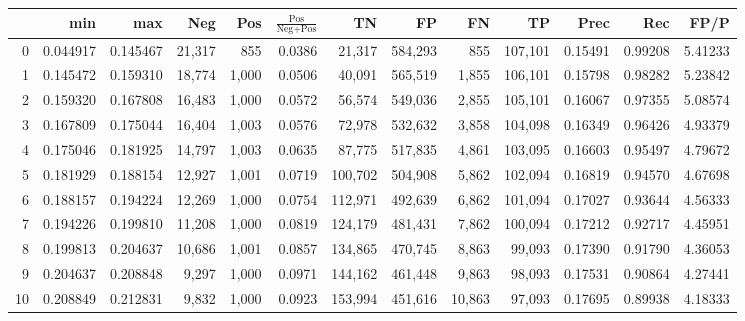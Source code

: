 \begin{tabular}{rrrrrrrrrrrrr}
\toprule
{} &       min &       max &     Neg &    Pos & $\frac{\text{Pos}}{\text{Neg}+\text{Pos}}$ &       TN &       FP &       FN &       TP &     Prec &      Rec &     FP/P \\
\midrule
0   &  0.044917 &  0.145467 &  21,317 &    855 &                                     0.0386 &   21,317 &  584,293 &      855 &  107,101 &  0.15491 &  0.99208 &  5.41233 \\
1   &  0.145472 &  0.159310 &  18,774 &  1,000 &                                     0.0506 &   40,091 &  565,519 &    1,855 &  106,101 &  0.15798 &  0.98282 &  5.23842 \\
2   &  0.159320 &  0.167808 &  16,483 &  1,000 &                                     0.0572 &   56,574 &  549,036 &    2,855 &  105,101 &  0.16067 &  0.97355 &  5.08574 \\
3   &  0.167809 &  0.175044 &  16,404 &  1,003 &                                     0.0576 &   72,978 &  532,632 &    3,858 &  104,098 &  0.16349 &  0.96426 &  4.93379 \\
4   &  0.175046 &  0.181925 &  14,797 &  1,003 &                                     0.0635 &   87,775 &  517,835 &    4,861 &  103,095 &  0.16603 &  0.95497 &  4.79672 \\
5   &  0.181929 &  0.188154 &  12,927 &  1,001 &                                     0.0719 &  100,702 &  504,908 &    5,862 &  102,094 &  0.16819 &  0.94570 &  4.67698 \\
6   &  0.188157 &  0.194224 &  12,269 &  1,000 &                                     0.0754 &  112,971 &  492,639 &    6,862 &  101,094 &  0.17027 &  0.93644 &  4.56333 \\
7   &  0.194226 &  0.199810 &  11,208 &  1,000 &                                     0.0819 &  124,179 &  481,431 &    7,862 &  100,094 &  0.17212 &  0.92717 &  4.45951 \\
8   &  0.199813 &  0.204637 &  10,686 &  1,001 &                                     0.0857 &  134,865 &  470,745 &    8,863 &   99,093 &  0.17390 &  0.91790 &  4.36053 \\
9   &  0.204637 &  0.208848 &   9,297 &  1,000 &                                     0.0971 &  144,162 &  461,448 &    9,863 &   98,093 &  0.17531 &  0.90864 &  4.27441 \\
10  &  0.208849 &  0.212831 &   9,832 &  1,000 &                                     0.0923 &  153,994 &  451,616 &   10,863 &   97,093 &  0.17695 &  0.89938 &  4.18333 \\

\end{tabular}
